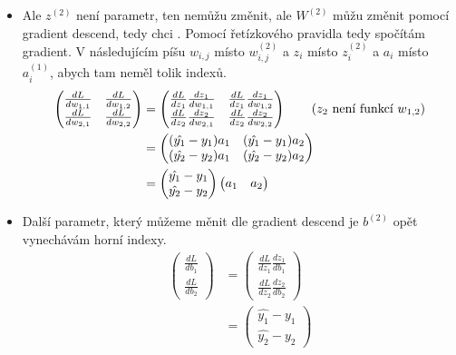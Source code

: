 \begin{itemize}
  \item  Ale $z^{(2)}$ není parametr, ten nemůžu změnit, ale $W^{(2)}$ můžu změnit pomocí gradient descend, tedy chci .
    Pomocí řetízkového pravidla tedy spočítám gradient.
    V následujícím píšu $w_{i,j}$ místo $w^{(2)}_{i,j}$ a $z_i$ místo $z^{(2)}_i$ a $a_i$ místo $a^{(1)}_i$, abych tam neměl tolik indexů.
    \begin{align*}
      \begin{pmatrix}
        \frac{dL}{dw_{1,1}}  & \frac{dL}{dw_{1,2}} \\
        \frac{dL}{dw_{2,1}}  & \frac{dL}{dw_{2,2}}
      \end{pmatrix}
      &=
      \begin{pmatrix}
        \frac{dL}{dz_1}\frac{dz_1}{dw_{1,1}}  & \frac{dL}{dz_1}\frac{dz_1}{dw_{1,2}} \\
        \frac{dL}{dz_2}\frac{dz_2}{dw_{2,1}}  & \frac{dL}{dz_2}\frac{dz_2}{dw_{2,2}}
      \end{pmatrix} \tag{$z_2$ není funkcí $w_{1,2}$} \\
      &=
      \begin{pmatrix}
        (\hat{y_1} - y_1)a_1 & (\hat{y_1} - y_1) a_2 \\
        (\hat{y_2} - y_2)a_1 & (\hat{y_2} - y_2) a_2
      \end{pmatrix} \\
      &=
      \begin{pmatrix}
        \hat{y_1} - y_1 \\
        \hat{y_2} - y_2 
      \end{pmatrix}
      \begin{pmatrix}
        a_1 & a_2
      \end{pmatrix}
    \end{align*}

  \item  Další parametr, který můžeme měnit dle gradient descend je $b^{(2)}$ opět vynechávám horní indexy.
    \begin{align*}
      \begin{pmatrix}
        \frac{dL}{db_1} \\
        \frac{dL}{db_2} 
      \end{pmatrix}
      &=
      \begin{pmatrix}
        \frac{dL}{dz_1}\frac{dz_1}{db_1} \\
        \frac{dL}{dz_2}\frac{dz_2}{db_2} 
      \end{pmatrix} \\
      &=
      \begin{pmatrix}
        \hat{y_1} - y_1 \\
        \hat{y_2} - y_2 
      \end{pmatrix} 
    \end{align*}


\end{itemize}
